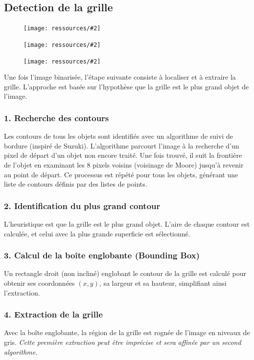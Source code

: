 \documentclass{article}
\newcommand{\stepimage}[3][0.3\textwidth]{%
  \minipage{#1}
    \texttt{[image: ressources/\#2]}
    \caption{#3}
  \endminipage\hfill
}
\begin{document}
\subsection{Detection de la grille}
\begin{figure}[!htb]
    \stepimage[0.30\textwidth]{image_1_step_05_grid_extraction.png}{}
    \stepimage[0.30\textwidth]{image_2_step_05_grid_extraction.png}{}
    \stepimage[0.26\textwidth]{image_3_step_05_grid_extraction.png}{}
\end{figure}

Une fois l'image binarisée, l'étape suivante consiste à localiser et à extraire la grille. L'approche est basée sur l'hypothèse que la grille est le plus grand objet de l'image.

\subsubsection{1. Recherche des contours}
Les contours de tous les objets sont identifiés avec un algorithme de suivi de bordure (inspiré de Suzuki). L'algorithme parcourt l'image à la recherche d'un pixel de départ d'un objet non encore traité. Une fois trouvé, il suit la frontière de l'objet en examinant les 8 pixels voisins (voisinage de Moore) jusqu'à revenir au point de départ. Ce processus est répété pour tous les objets, générant une liste de contours définis par des listes de points.

\subsubsection{2. Identification du plus grand contour}
L'heuristique est que la grille est le plus grand objet. L'aire de chaque contour est calculée, et celui avec la plus grande superficie est sélectionné.

\subsubsection{3. Calcul de la boîte englobante (Bounding Box)}
Un rectangle droit (non incliné) englobant le contour de la grille est calculé pour obtenir ses coordonnées \((x, y)\), sa largeur et sa hauteur, simplifiant ainsi l'extraction.

\subsubsection{4. Extraction de la grille}
Avec la boîte englobante, la région de la grille est rognée de l'image en niveaux de gris. \newline\textcolor{orange}{\HandRight} \textit{Cette première extraction peut être imprécise et sera affinée par un second algorithme.}
\end{document}
